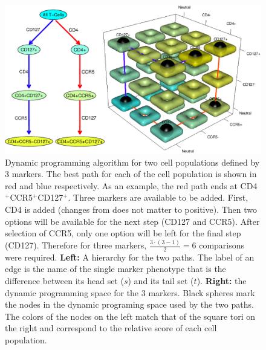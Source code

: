 \begin{landscape}
\begin{figure}[ht]
  \begin{center}
    \includegraphics[width=15cm]{figs/rchy/2path}
  \end{center}
  \caption{Dynamic programming algorithm for two cell populations defined by $3$ markers.
    The best path for each of the cell population is shown in red and blue respectively.
    As an example, the red path ends at CD4$^+$CCR5$^+$CD127$^+$.
    Three markers are available to be added.
    First, CD4 is added (changes from does not matter to positive).
    Then two options will be available for the next step (CD127 and CCR5).
    After selection of CCR5, only one option will be left for the final step (CD127).
    Therefore for three markers, $\frac{3 \cdot (3-1)}{2}=6$ comparisons were required.
	\textbf{Left:} A hierarchy for the two paths. The label of an edge is the name of the single marker phenotype that
	is the difference between its head set ($s$) and its tail set ($t$).  \textbf{Right:} the dynamic programming space
	for the $3$ markers. Black spheres mark the nodes in the dynamic programing space used by the two paths. 
	The colors of the nodes on the left match that of the square tori on the right and  correspond to the relative score of each cell population. 
}
  \label{r1:3dDP}
\end{figure}
\end{landscape}

